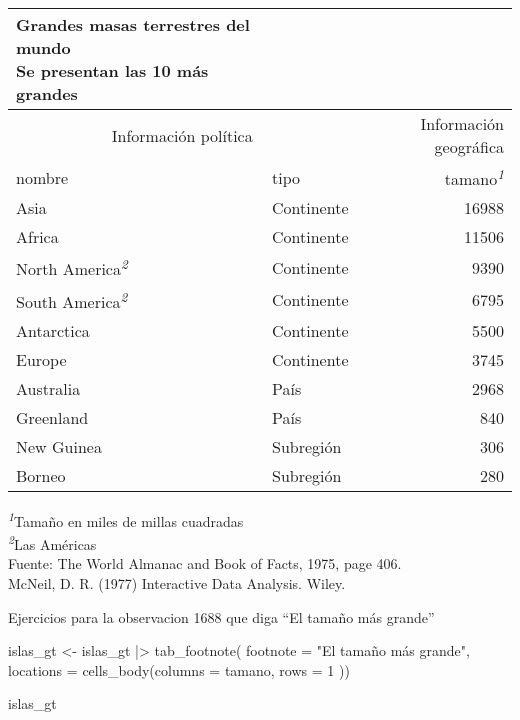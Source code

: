 \documentclass[
]{article}
\newenvironment{Shaded}{\begin{snugshade}}{\end{snugshade}}
\newcommand{\AttributeTok}[1]{\textcolor[rgb]{0.77,0.63,0.00}{#1}}
\newcommand{\DecValTok}[1]{\textcolor[rgb]{0.00,0.00,0.81}{#1}}
\newcommand{\FunctionTok}[1]{\textcolor[rgb]{0.00,0.00,0.00}{#1}}
\newcommand{\NormalTok}[1]{#1}
\newcommand{\OtherTok}[1]{\textcolor[rgb]{0.56,0.35,0.01}{#1}}
\newcommand{\SpecialCharTok}[1]{\textcolor[rgb]{0.00,0.00,0.00}{#1}}
\newcommand{\StringTok}[1]{\textcolor[rgb]{0.31,0.60,0.02}{#1}}
\begin{document}
\setlength{\LTpost}{0mm}
\begin{longtable}{llr}
\caption*{
{\large Grandes masas terrestres del mundo} \\ 
{\small Se presentan las 10 más grandes}
} \\ 
\toprule
\multicolumn{2}{c}{Información política} & Información geográfica \\ 
\cmidrule(lr){1-2} \cmidrule(lr){3-3}
nombre & tipo & tamano\textsuperscript{\textit{1}} \\ 
\midrule
Asia & Continente & 16988 \\ 
Africa & Continente & 11506 \\ 
North America\textsuperscript{\textit{2}} & Continente & 9390 \\ 
South America\textsuperscript{\textit{2}} & Continente & 6795 \\ 
Antarctica & Continente & 5500 \\ 
Europe & Continente & 3745 \\ 
Australia & País & 2968 \\ 
Greenland & País & 840 \\ 
New Guinea & Subregión & 306 \\ 
Borneo & Subregión & 280 \\ 
\bottomrule
\end{longtable}
\begin{minipage}{\linewidth}
\textsuperscript{\textit{1}}Tamaño en miles de millas cuadradas\\
\textsuperscript{\textit{2}}Las Américas\\
Fuente: The World Almanac and Book of Facts, 1975, page 406.\\
McNeil, D. R. (1977) Interactive Data Analysis. Wiley.\\
\end{minipage}

Ejercicios para la observacion 1688 que diga ``El tamaño más grande''

\begin{Shaded}
\begin{Highlighting}[]
\NormalTok{islas\_gt }\OtherTok{\textless{}{-}}\NormalTok{ islas\_gt }\SpecialCharTok{|\textgreater{}} 
\FunctionTok{tab\_footnote}\NormalTok{( }
  \AttributeTok{footnote =} \StringTok{"El tamaño más grande"}\NormalTok{,}
  \AttributeTok{locations =}  \FunctionTok{cells\_body}\NormalTok{(}\AttributeTok{columns =}\NormalTok{ tamano, }\AttributeTok{rows =} \DecValTok{1}\NormalTok{ ))}

\NormalTok{islas\_gt}
\end{Highlighting}
\end{Shaded}
\end{document}

